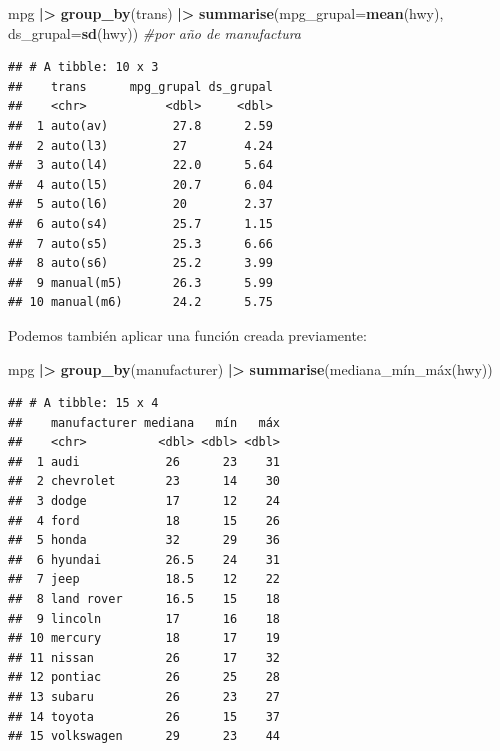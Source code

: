 \documentclass[
]{article}
\newenvironment{Shaded}{\begin{snugshade}}{\end{snugshade}}
\newcommand{\AttributeTok}[1]{\textcolor[rgb]{0.13,0.29,0.53}{#1}}
\newcommand{\CommentTok}[1]{\textcolor[rgb]{0.56,0.35,0.01}{\textit{#1}}}
\newcommand{\FunctionTok}[1]{\textcolor[rgb]{0.13,0.29,0.53}{\textbf{#1}}}
\newcommand{\NormalTok}[1]{#1}
\newcommand{\SpecialCharTok}[1]{\textcolor[rgb]{0.81,0.36,0.00}{\textbf{#1}}}
\begin{document}
\begin{Shaded}
\begin{Highlighting}[]
\NormalTok{mpg }\SpecialCharTok{|\textgreater{}}
  \FunctionTok{group\_by}\NormalTok{(trans) }\SpecialCharTok{|\textgreater{}}
  \FunctionTok{summarise}\NormalTok{(}\AttributeTok{mpg\_grupal=}\FunctionTok{mean}\NormalTok{(hwy),}
            \AttributeTok{ds\_grupal=}\FunctionTok{sd}\NormalTok{(hwy)) }\CommentTok{\#por año de manufactura}
\end{Highlighting}
\end{Shaded}

\begin{verbatim}
## # A tibble: 10 x 3
##    trans      mpg_grupal ds_grupal
##    <chr>           <dbl>     <dbl>
##  1 auto(av)         27.8      2.59
##  2 auto(l3)         27        4.24
##  3 auto(l4)         22.0      5.64
##  4 auto(l5)         20.7      6.04
##  5 auto(l6)         20        2.37
##  6 auto(s4)         25.7      1.15
##  7 auto(s5)         25.3      6.66
##  8 auto(s6)         25.2      3.99
##  9 manual(m5)       26.3      5.99
## 10 manual(m6)       24.2      5.75
\end{verbatim}

Podemos también aplicar una función creada previamente:

\begin{Shaded}
\begin{Highlighting}[]
\NormalTok{mpg }\SpecialCharTok{|\textgreater{}} \FunctionTok{group\_by}\NormalTok{(manufacturer) }\SpecialCharTok{|\textgreater{}} \FunctionTok{summarise}\NormalTok{(mediana\_mín\_máx(hwy))}
\end{Highlighting}
\end{Shaded}

\begin{verbatim}
## # A tibble: 15 x 4
##    manufacturer mediana   mín   máx
##    <chr>          <dbl> <dbl> <dbl>
##  1 audi            26      23    31
##  2 chevrolet       23      14    30
##  3 dodge           17      12    24
##  4 ford            18      15    26
##  5 honda           32      29    36
##  6 hyundai         26.5    24    31
##  7 jeep            18.5    12    22
##  8 land rover      16.5    15    18
##  9 lincoln         17      16    18
## 10 mercury         18      17    19
## 11 nissan          26      17    32
## 12 pontiac         26      25    28
## 13 subaru          26      23    27
## 14 toyota          26      15    37
## 15 volkswagen      29      23    44
\end{verbatim}
\end{document}
